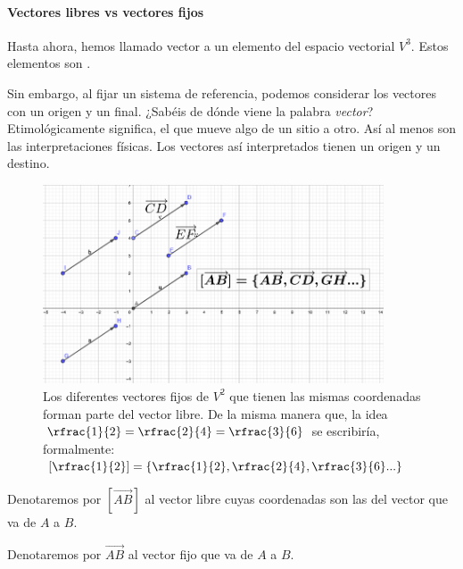 \paragraph{Vectores libres vs vectores fijos}


Hasta ahora, hemos llamado vector a un elemento del espacio vectorial $V^3$. 
%
Estos elementos son .

Sin embargo, al fijar un sistema de referencia, podemos considerar los vectores con un origen y un final. 
%
¿Sabéis de dónde viene la palabra \textit{vector}? 
%
Etimológicamente significa, el que mueve algo de un sitio a otro. 
%
Así al menos son las interpretaciones físicas. 
%
Los vectores así interpretados tienen un origen y un destino.

\begin{figure}[hptb]
    \centering
    \includegraphics[width=0.9\textwidth]{img/Fijos-libres.png}
    \caption{Los diferentes vectores fijos de $V^2$ que tienen las mismas coordenadas forman parte del vector libre. 
    \newline
    De la misma manera que, la idea $\rfrac{1}{2}=\rfrac{2}{4}=\rfrac{3}{6}$ se escribiría, formalmente: $\left[\rfrac{1}{2}\right] = \left\{\rfrac{1}{2},\rfrac{2}{4},\rfrac{3}{6} ... \right\}$}
    \label{fig:plano}
\end{figure}


Denotaremos por $[\vec{AB}]$ al vector libre cuyas coordenadas son las del vector que va de $A$ a $B$.

Denotaremos por $\vec{AB}$ al vector fijo que va de $A$ a $B$.





